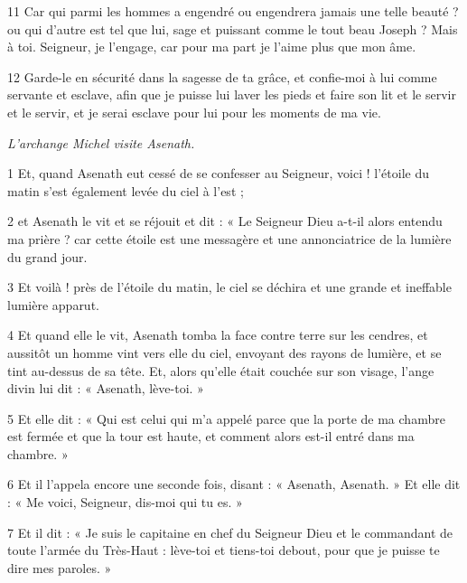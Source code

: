 \par 11 Car qui parmi les hommes a engendré ou engendrera jamais une telle beauté ? ou qui d'autre est tel que lui, sage et puissant comme le tout beau Joseph ? Mais à toi. Seigneur, je l'engage, car pour ma part je l'aime plus que mon âme.

\par 12 Garde-le en sécurité dans la sagesse de ta grâce, et confie-moi à lui comme servante et esclave, afin que je puisse lui laver les pieds et faire son lit et le servir et le servir, et je serai esclave pour lui pour les moments de ma vie.


\par \textit{L'archange Michel visite Asenath.}

\par 1 Et, quand Asenath eut cessé de se confesser au Seigneur, voici ! l'étoile du matin s'est également levée du ciel à l'est ;

\par 2 et Asenath le vit et se réjouit et dit : « Le Seigneur Dieu a-t-il alors entendu ma prière ? car cette étoile est une messagère et une annonciatrice de la lumière du grand jour.

\par 3 Et voilà ! près de l’étoile du matin, le ciel se déchira et une grande et ineffable lumière apparut.

\par 4 Et quand elle le vit, Asenath tomba la face contre terre sur les cendres, et aussitôt un homme vint vers elle du ciel, envoyant des rayons de lumière, et se tint au-dessus de sa tête. Et, alors qu'elle était couchée sur son visage, l'ange divin lui dit : « Asenath, lève-toi. »

\par 5 Et elle dit : « Qui est celui qui m'a appelé parce que la porte de ma chambre est fermée et que la tour est haute, et comment alors est-il entré dans ma chambre. »

\par 6 Et il l'appela encore une seconde fois, disant : « Asenath, Asenath. » Et elle dit : « Me voici, Seigneur, dis-moi qui tu es. »

\par 7 Et il dit : « Je suis le capitaine en chef du Seigneur Dieu et le commandant de toute l'armée du Très-Haut : lève-toi et tiens-toi debout, pour que je puisse te dire mes paroles. »

